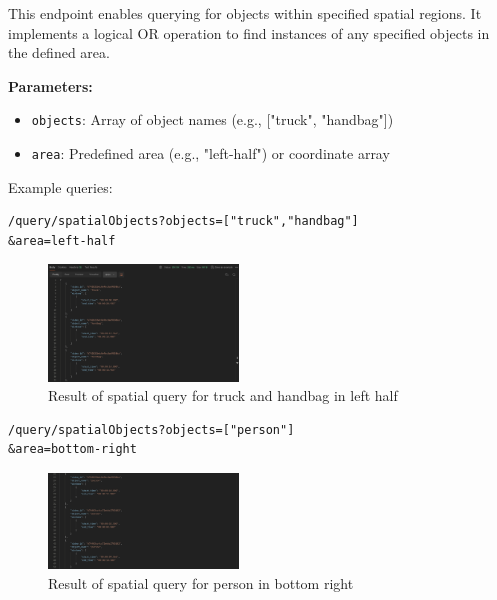 \documentclass[conference]{IEEEtran}
\begin{document}
This endpoint enables querying for objects within specified spatial regions. It implements a logical OR operation to find instances of any specified objects in the defined area.

\textbf{Parameters:}
\begin{itemize}
    \item \texttt{objects}: Array of object names (e.g., ["truck", "handbag"])
    \item \texttt{area}: Predefined area (e.g., "left-half") or coordinate array
\end{itemize}

Example queries:\\
\begin{minipage}{\linewidth}
\scriptsize
\begin{verbatim}
/query/spatialObjects?objects=["truck","handbag"]
&area=left-half
\end{verbatim}
\end{minipage}

\begin{figure}[H]
    \centering
    \includegraphics[width=0.45\textwidth]{1.jpeg}
    \caption{Result of spatial query for truck and handbag in left half}
    \label{fig:query1}
\end{figure}

\begin{minipage}{\linewidth}
\scriptsize
\begin{verbatim}
/query/spatialObjects?objects=["person"]
&area=bottom-right
\end{verbatim}
\end{minipage}

\begin{figure}[H]
    \centering
    \includegraphics[width=0.45\textwidth]{2.jpeg}
    \caption{Result of spatial query for person in bottom right}
    \label{fig:query2}
\end{figure}
\end{document}
